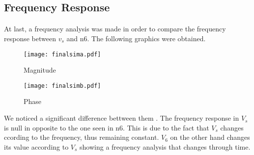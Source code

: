 \subsection{Frequency Response}
\paragraph{}

\par At last, a frequency analysis was made in order to compare the frequency response between $v_s$ and n6. The following graphics were obtained.




\begin{figure}[H]
    \texttt{[image: finalsima.pdf]}
    \centering
    \caption{Magnitude}
    \label{mag}
\end{figure}

\begin{figure}[H]
    \texttt{[image: finalsimb.pdf]}
    \centering
    \caption{Phase}
    \label{mag}
\end{figure}

\par We noticed a significant difference bettween them . The frequency response in $V_s$ is null in opposite to the one seen in n6. This is due to the fact that $V_s$ changes ccording to the frequency, thus remaining constant. $V_6$ on the other hand changes its value according to $V_s$ showing a frequency analysis that changes through time.





